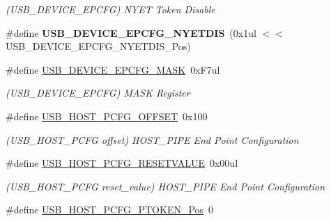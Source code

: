 \begin{DoxyCompactItemize}
\begin{DoxyCompactList}\small\item\em (U\+S\+B\+\_\+\+D\+E\+V\+I\+C\+E\+\_\+\+E\+P\+C\+F\+G) N\+Y\+E\+T Token Disable \end{DoxyCompactList}\item 
\hypertarget{group___s_a_m_l21___u_s_b_ga54af86926e8ec63762324d02cfd3eea0}{}\#define {\bfseries U\+S\+B\+\_\+\+D\+E\+V\+I\+C\+E\+\_\+\+E\+P\+C\+F\+G\+\_\+\+N\+Y\+E\+T\+D\+I\+S}~(0x1ul $<$$<$ U\+S\+B\+\_\+\+D\+E\+V\+I\+C\+E\+\_\+\+E\+P\+C\+F\+G\+\_\+\+N\+Y\+E\+T\+D\+I\+S\+\_\+\+Pos)\label{group___s_a_m_l21___u_s_b_ga54af86926e8ec63762324d02cfd3eea0}

\item 
\hypertarget{group___s_a_m_l21___u_s_b_gaf641b5bdf032e6a48b441fcc1796dbe9}{}\#define \hyperlink{group___s_a_m_l21___u_s_b_gaf641b5bdf032e6a48b441fcc1796dbe9}{U\+S\+B\+\_\+\+D\+E\+V\+I\+C\+E\+\_\+\+E\+P\+C\+F\+G\+\_\+\+M\+A\+S\+K}~0x\+F7ul\label{group___s_a_m_l21___u_s_b_gaf641b5bdf032e6a48b441fcc1796dbe9}

\begin{DoxyCompactList}\small\item\em (U\+S\+B\+\_\+\+D\+E\+V\+I\+C\+E\+\_\+\+E\+P\+C\+F\+G) M\+A\+S\+K Register \end{DoxyCompactList}\item 
\hypertarget{group___s_a_m_l21___u_s_b_ga58a819b3f29b674214f3bd14c3353dfe}{}\#define \hyperlink{group___s_a_m_l21___u_s_b_ga58a819b3f29b674214f3bd14c3353dfe}{U\+S\+B\+\_\+\+H\+O\+S\+T\+\_\+\+P\+C\+F\+G\+\_\+\+O\+F\+F\+S\+E\+T}~0x100\label{group___s_a_m_l21___u_s_b_ga58a819b3f29b674214f3bd14c3353dfe}

\begin{DoxyCompactList}\small\item\em (U\+S\+B\+\_\+\+H\+O\+S\+T\+\_\+\+P\+C\+F\+G offset) H\+O\+S\+T\+\_\+\+P\+I\+P\+E End Point Configuration \end{DoxyCompactList}\item 
\hypertarget{group___s_a_m_l21___u_s_b_ga4367bfbd135862a5143da5ff702822ec}{}\#define \hyperlink{group___s_a_m_l21___u_s_b_ga4367bfbd135862a5143da5ff702822ec}{U\+S\+B\+\_\+\+H\+O\+S\+T\+\_\+\+P\+C\+F\+G\+\_\+\+R\+E\+S\+E\+T\+V\+A\+L\+U\+E}~0x00ul\label{group___s_a_m_l21___u_s_b_ga4367bfbd135862a5143da5ff702822ec}

\begin{DoxyCompactList}\small\item\em (U\+S\+B\+\_\+\+H\+O\+S\+T\+\_\+\+P\+C\+F\+G reset\+\_\+value) H\+O\+S\+T\+\_\+\+P\+I\+P\+E End Point Configuration \end{DoxyCompactList}\item 
\hypertarget{group___s_a_m_l21___u_s_b_ga7281dcd97dbe27666a291c0f02724de7}{}\#define \hyperlink{group___s_a_m_l21___u_s_b_ga7281dcd97dbe27666a291c0f02724de7}{U\+S\+B\+\_\+\+H\+O\+S\+T\+\_\+\+P\+C\+F\+G\+\_\+\+P\+T\+O\+K\+E\+N\+\_\+\+Pos}~0\label{group___s_a_m_l21___u_s_b_ga7281dcd97dbe27666a291c0f02724de7}


\end{DoxyCompactItemize}
